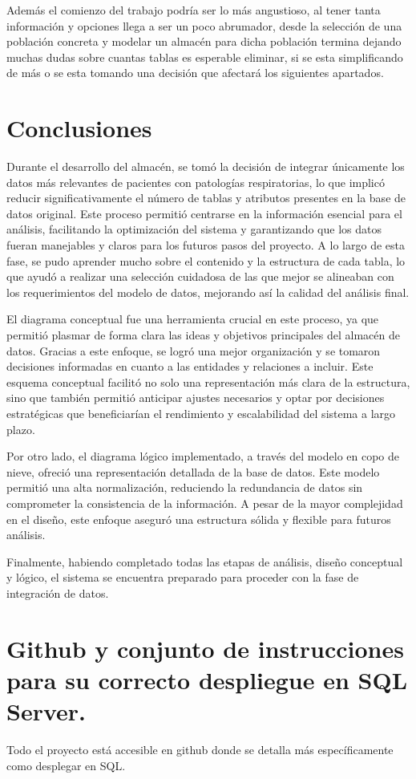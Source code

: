 \documentclass[12pt, a4paper, twoside]{article}
\begin{document}
	Además el comienzo del trabajo podría ser lo más angustioso, al tener tanta información y opciones llega a ser un poco abrumador, desde la selección de una población concreta y modelar un almacén para dicha población termina dejando muchas dudas sobre cuantas tablas es esperable eliminar, si se esta simplificando de más o se esta tomando una decisión que afectará los siguientes apartados. 
	
	\section{Conclusiones}
	
	Durante el desarrollo del almacén, se tomó la decisión de integrar únicamente los datos más relevantes de pacientes con patologías respiratorias, lo que implicó reducir significativamente el número de tablas y atributos presentes en la base de datos original. Este proceso permitió centrarse en la información esencial para el análisis, facilitando la optimización del sistema y garantizando que los datos fueran manejables y claros para los futuros pasos del proyecto. A lo largo de esta fase, se pudo aprender mucho sobre el contenido y la estructura de cada tabla, lo que ayudó a realizar una selección cuidadosa de las que mejor se alineaban con los requerimientos del modelo de datos, mejorando así la calidad del análisis final.
	
	El diagrama conceptual fue una herramienta crucial en este proceso, ya que permitió plasmar de forma clara las ideas y objetivos principales del almacén de datos. Gracias a este enfoque, se logró una mejor organización y se tomaron decisiones informadas en cuanto a las entidades y relaciones a incluir. Este esquema conceptual facilitó no solo una representación más clara de la estructura, sino que también permitió anticipar ajustes necesarios y optar por decisiones estratégicas que beneficiarían el rendimiento y escalabilidad del sistema a largo plazo.
	
	Por otro lado, el diagrama lógico implementado, a través del modelo en copo de nieve, ofreció una representación detallada de la base de datos. Este modelo permitió una alta normalización, reduciendo la redundancia de datos sin comprometer la consistencia de la información. A pesar de la mayor complejidad en el diseño, este enfoque aseguró una estructura sólida y flexible para futuros análisis.
	
	Finalmente, habiendo completado todas las etapas de análisis, diseño conceptual y lógico, el sistema se encuentra preparado para proceder con la fase de integración de datos. 
	


	\section{Github y conjunto de instrucciones para su correcto despliegue en SQL Server.}

	Todo el proyecto está accesible en github \cite{depab2024} donde se detalla más específicamente como desplegar en SQL.
	\printbibliography
	
	
	
	
\end{document}
